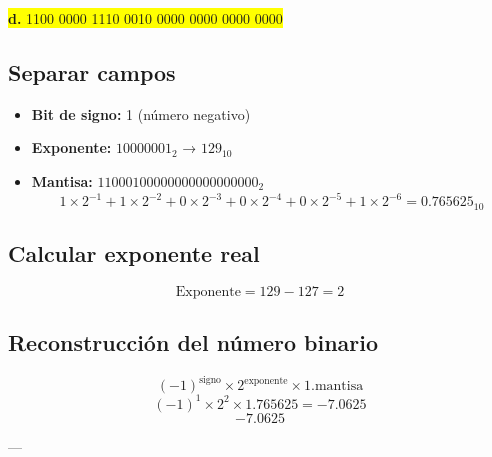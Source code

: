 \documentclass[a4paper,12pt]{article}
\begin{document}
	\begin{center}
		\colorbox{yellow}{\textbf{d.} 1100 0000 1110 0010 0000 0000 0000 0000}
		
		\subsection*{Separar campos}
		
		\begin{itemize}
			\item \textbf{Bit de signo:} 1 (número negativo)
			\item \textbf{Exponente:} $10000001_2$ → $129_{10}$
			\item \textbf{Mantisa:} $11000100000000000000000_2$ 
			\[
			1\times2^{-1} + 1\times2^{-2} + 0\times2^{-3} + 0\times2^{-4} + 0\times2^{-5} + 1\times2^{-6} = 0.765625_{10}
			\]
		\end{itemize}
		
		\subsection*{Calcular exponente real}
		
		\[
		\text{Exponente} = 129 - 127 = 2
		\]
		
		
		
		\subsection*{Reconstrucción del número binario}	
		\[
		(-1)^{\text{signo}} \times 2^{\text{exponente}} \times 1.\text{mantisa}
		\]
		\[
		(-1)^1 \times 2^2 \times 1.765625 = -7.0625
		\]
		\vspace{1em}
		\[
		\boxed{-7.0625}
		\]
		
		---
	\end{center}

	
\end{document}
